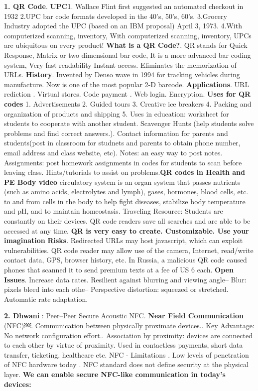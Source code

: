 \documentclass[9pt]{extarticle}
\begin{document}
\begin{multicols}{2}
\textbf{1. QR Code}. \textbf{UPC}1. Wallace Flint first suggested an automated checkout in 1932 2.UPC bar code formats developed in the 40’s, 50’s, 60’s. 3.Grocery Industry adopted the UPC (based on an IBM proposal) April 3, 1973. 4.With computerized scanning, inventory, With computerized scanning, inventory, UPCs are ubiquitous on every product! \textbf{What is a QR Code?}. QR stands for Quick Response, Matrix or two dimensional bar code, It is a more advanced bar coding system, Very fast readability Instant access. Eliminates the memorization of URLs. \textbf{History}. Invented by Denso wave in 1994 for tracking vehicles during manufacture. Now is one of the most popular 2-D barcode. \textbf{Applications}. URL rediction . Virtual stores. Code payment . Web login. Encryption. \textbf{Uses for QR codes} 1. Advertisements 2. Guided tours 3. Creative ice breakers 4. Packing and organization of products and shipping 5. Uses in education: worksheet for students to cooperate with another student. Scavenger Hunts (help students solve problems and find correct answers.). Contact information for parents and students(post in classroom for studnets and parents to obtain phone number, email address and class website, etc). Notes: an easy way to post notes. Assignments: post homework assignments in codes for students to scan before leaving class. Hints/tutorials to assist on problems.\textbf{QR codes in Health and PE Body video} circulatory system is an organ system that passes nutrients (such as amino acids, electrolytes and lymph), gases, hormones, blood cells, etc. to and from cells in the body to help fight diseases, stabilize body temperature and pH, and to maintain homeostasis. Traveling Resource: 
Students are constantly on their devices. QR code readers save all searches and are able to be accessed at any time. \textbf{QR is very easy to create. Customizable. Use your imagination} \textbf{Risks}. Redirected URLs may host javascript, which can exploit vulnerabilities. QR code reader may allow use of the camera, Internet, read/write contact data, GPS, browser history, etc. In Russia, a malicious QR code caused phones that scanned it to send premium texts at a fee of US 6 each.\textbf{ Open Issues}. Increase data rates. Resilient against blurring and viewing angle– Blur: pixels bleed into each othe– Perspective distortion: squeezed or stretched. Automatic rate adaptation.

\textbf{2. Dhwani} : Peer–Peer Secure Acoustic NFC. \textbf{Near Field Communication} (NFC)￼. Communication between physically proximate devices.. Key Advantage: No network configuration effort.. Association by proximity: devices are connected to each other by virtue of proximity. Used in contactless payments, short data transfer, ticketing, healthcare etc. NFC - Limitations
. Low levels of penetration of NFC hardware today
. NFC standard does not define security at the physical layer. \textbf{We can enable secure NFC-like communication in today's devices:} 


\end{multicols}
\end{document}

